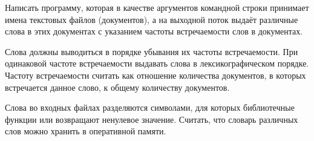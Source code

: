 
Написать программу, которая в качестве аргументов командной строки
принимает имена текстовых файлов (документов), а на выходной поток
выдаёт различные слова в этих документах с указанием частоты
встречаемости слов в документах.

Слова должны выводиться в порядке
убывания их частоты встречаемости. При одинаковой частоте
встречаемости выдавать слова в лексикографическом порядке. Частоту
встречаемости считать как отношение количества документов, в которых
встречается данное слово, к общему количеству документов.

Слова во
входных файлах разделяются символами, для которых библиотечные
функции  или  возвращают ненулевое значение. Считать,
что словарь различных слов можно хранить в оперативной памяти.
